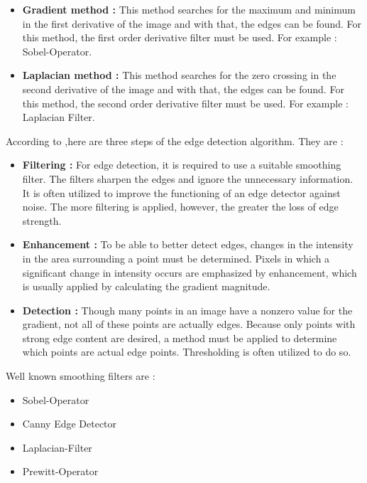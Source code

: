 \begin{itemize}

\item \textbf{Gradient method : } This method searches for the maximum and minimum in the first derivative of the image and with that, the edges can be found. For this method, the first order derivative filter must be used. For example : Sobel-Operator.
 
\item \textbf{Laplacian method : } This method searches for the zero crossing in the second derivative of the image and with that, the edges can be found. For this method, the second order derivative filter must be used. For example : Laplacian Filter. 
  
\end{itemize}
 
According to \cite{Machine_Vision},here are three steps of the edge detection algorithm. They are :

\begin{itemize}

\item \textbf{Filtering : } For edge detection, it is required to use a suitable smoothing filter. The filters sharpen the edges and ignore the unnecessary information. It is often utilized to improve the functioning of an edge detector against noise. The more filtering is applied, however, the greater the loss of edge strength.
 
\item \textbf{Enhancement : } To be able to better detect edges, changes in the intensity in the area surrounding a point must be determined. Pixels in which a significant change in intensity occurs are emphasized by enhancement, which is usually applied by calculating the gradient magnitude.
  
\item \textbf{Detection : } Though many points in an image have a nonzero value for the gradient, not all of these points are actually edges. Because only points with strong edge content are desired, a method must be applied to determine which points are actual edge points. Thresholding is often utilized to do so.
 
\end{itemize}

Well known smoothing filters are :

\begin{itemize}

 \item Sobel-Operator
 \item Canny Edge Detector
 \item Laplacian-Filter
 \item Prewitt-Operator
 
 \end{itemize}
 
